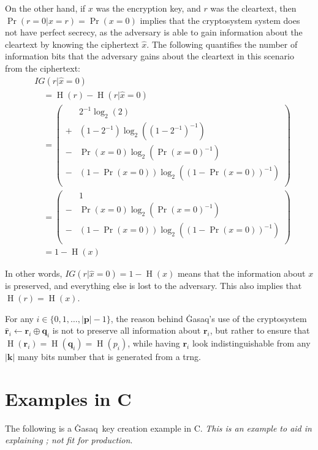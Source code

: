 \documentclass[twocolumn,hidelinks]{article}
\newcommand{\ghasaq}{Ġasaq}
\DeclareMathOperator{\entropy}{H}
\begin{document}
On the other hand, if $x$ was the encryption key, and $r$ was the
cleartext, then $\Pr(r=0 | x=r) = \Pr(x=0)$ implies that the cryptosystem
system does not have perfect secrecy, as the adversary is able to gain
information about the cleartext by knowing the ciphertext $\hat x$. The
following quantifies the number of information bits that the adversary
gains about the cleartext in this scenario from the ciphertext:
\[\begin{split}
    & IG(r|\hat x = 0) \\
    &\quad= \entropy(r) - \entropy(r|\hat x = 0)\\
    &\quad= \left(\begin{split}
        & 2^{-1}\log_2(2)\\
        + & (1-2^{-1})\log_2((1-2^{-1})^{-1})\\
        - & \Pr(x=0)\log_2(\Pr(x=0)^{-1})\\
        - & (1-\Pr(x=0))\log_2((1-\Pr(x=0))^{-1})\\
    \end{split}\right)\\
    &\quad= \left(\begin{split}
        & 1\\
        - & \Pr(x=0)\log_2(\Pr(x=0)^{-1})\\
        - & (1-\Pr(x=0))\log_2((1-\Pr(x=0))^{-1})\\
    \end{split}\right)\\
    &\quad= 1 - \entropy(x)
\end{split}\]

In other words, $IG(r|\hat x = 0) = 1 - \entropy(x)$ means that the
information about $x$ is preserved, and everything else is lost to the
adversary.  This also implies that $\entropy(r) = \entropy(x)$.

For any $i \in \{0, 1, \ldots, |\mathbf{p}|-1\}$, the reason behind
\ghasaq's use of the cryptosystem $\mathbf{\hat r}_i \gets \mathbf{r}_i
\oplus \mathbf{q}_i$ is not to preserve all information about
$\mathbf{r}_i$, but rather to ensure that $\entropy(\mathbf{r}_i) =
\entropy(\mathbf{q}_i) = \entropy(p_i)$, while having $\mathbf{r}_i$ look
indistinguishable from any $|\mathbf{k}|$ many bits number that is
generated from a \gls{trng}.

\vfill
\break
\section{Examples in C}\label{sec_c_examples}
The following is a \ghasaq\ key creation example in C.  \emph{This is an
example to aid in explaining ; not fit for
production}.
\end{document}
